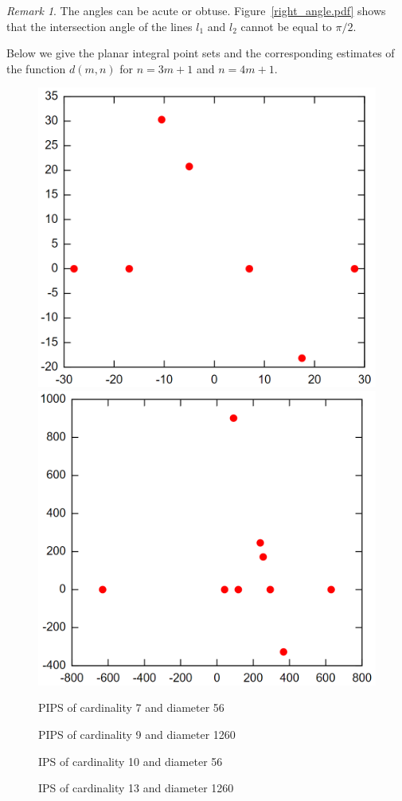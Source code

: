 \documentclass[12pt]{article}
\theoremstyle{theorem}
\theoremstyle{dfn}
\theoremstyle{remark}
\newtheorem{remark}{Remark}
\begin{document}
\begin{remark}
The angles can be acute or obtuse. Figure~\ref{right_angle.pdf} shows that the intersection angle of the lines $l_{1}$ and $l_{2}$ cannot be equal to ${\pi}/2$.
\end{remark}

Below we give the planar integral point sets and the corresponding
estimates of the function $d(m, n)$ for $n = 3m + 1$ and $n = 4m + 1$.

\begin{figure}[htbp]
	\includegraphics[width=.48\linewidth]{picture_56.png}
	\hfill
	\includegraphics[width=.48\linewidth]{picture_1260.png}
	\\
	\parbox{.48\linewidth}{\caption{PIPS of cardinality 7 and diameter 56}
	\label{picture_56.png}}
	\hfill
	\parbox{.48\linewidth}{\caption{PIPS of cardinality 9 and diameter 1260}
	\label{picture_1260.png}}
\end{figure}

\begin{figure}[h!]
\parbox{1\linewidth}{\caption{IPS of cardinality 10 and diameter 56}
\label{picture_12.pdf}}
\end{figure}

\begin{figure}[h!]
\parbox{1\linewidth}{\caption{IPS of cardinality 13 and diameter 1260}
\label{picture_1260_R3.pdf}}
\end{figure}
\end{document}
